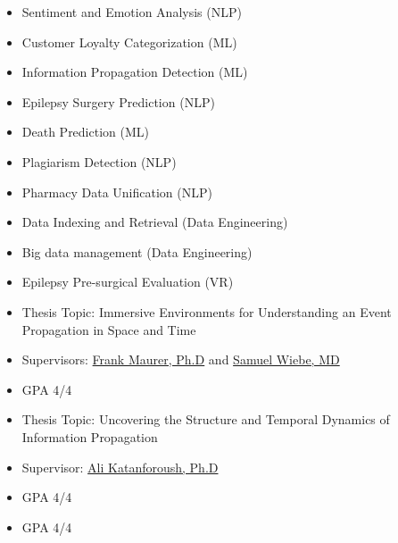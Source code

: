 \documentclass[10pt,a4paper]{altacv}
\begin{document}
%
\medskip
{}
\begin{itemize}
	\item Sentiment and Emotion Analysis (NLP)
	      
	\item Customer Loyalty Categorization (ML)
	      
	\item Information Propagation Detection (ML)
	\item Epilepsy Surgery Prediction (NLP)
	      
	\item Death Prediction (ML)
	      
	\item Plagiarism Detection (NLP)
	      
	\item Pharmacy Data Unification (NLP) \item Data Indexing and Retrieval (Data Engineering)
	\item Big data management (Data Engineering)
	\item Epilepsy Pre-surgical Evaluation (VR)
\end{itemize}

\let\olditem\item
{}
\renewcommand*\labelenumi{[\theenumi]}
\begin{itemize}
	\item Thesis Topic: Immersive Environments for Understanding an Event Propagation in Space and Time   \item Supervisors:
	      \href{https://contacts.ucalgary.ca/info/cpsc/profiles/102-3556}
	      { Frank Maurer, Ph.D}
	      and
	      \href{https://contacts.ucalgary.ca/info/chs/profiles/1-4838306}
	      { Samuel Wiebe, MD}
	\item GPA 4/4
\end{itemize}

\divider

\begin{itemize}
	
	\item Thesis Topic: Uncovering the Structure and Temporal Dynamics of Information Propagation
	\item Supervisor:
	      \href{http://faculties.sbu.ac.ir/~katanforoush/}
	      {Ali Katanforoush, Ph.D}
	\item GPA 4/4
\end{itemize}

\divider

\begin{itemize}
	\item GPA 4/4
\end{itemize}
\medskip
\end{document}
